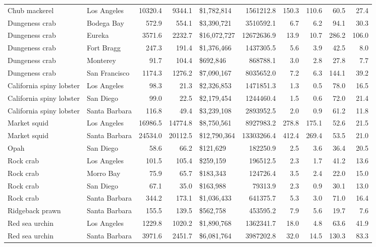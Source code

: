 \documentclass[
  letterpaper,
  DIV=11,
  numbers=noendperiod]{scrartcl}
\begin{document}
\begin{table}
{\begin{tabular}{llrrlrrrrr}
Chub mackerel & Los Angeles & 10320.4 & 9344.1 & \$1,782,814 & 1561212.8 & 150.3 & 110.6 & 60.5 & 27.4\\
Dungeness crab & Bodega Bay & 572.9 & 554.1 & \$3,390,721 & 3510592.1 & 6.7 & 6.2 & 94.1 & 30.3\\
\addlinespace
Dungeness crab & Eureka & 3571.6 & 2232.7 & \$16,072,727 & 12672636.9 & 13.9 & 10.7 & 286.2 & 106.0\\
Dungeness crab & Fort Bragg & 247.3 & 191.4 & \$1,376,466 & 1437305.5 & 5.6 & 3.9 & 42.5 & 8.0\\
Dungeness crab & Monterey & 91.7 & 104.4 & \$692,846 & 868788.1 & 3.0 & 2.8 & 27.8 & 7.7\\
Dungeness crab & San Francisco & 1174.3 & 1276.2 & \$7,090,167 & 8035652.0 & 7.2 & 6.3 & 144.1 & 39.2\\
California spiny lobster & Los Angeles & 98.3 & 21.3 & \$2,326,853 & 1471851.3 & 1.3 & 0.5 & 78.0 & 16.5\\
\addlinespace
California spiny lobster & San Diego & 99.0 & 22.5 & \$2,179,454 & 1244460.4 & 1.5 & 0.6 & 72.0 & 21.4\\
California spiny lobster & Santa Barbara & 116.8 & 49.4 & \$3,239,108 & 2893952.5 & 2.0 & 0.9 & 61.2 & 11.8\\
Market squid & Los Angeles & 16986.5 & 14774.8 & \$8,750,561 & 8927983.2 & 278.8 & 175.1 & 52.6 & 21.5\\
Market squid & Santa Barbara & 24534.0 & 20112.5 & \$12,790,364 & 13303266.4 & 412.4 & 269.4 & 53.5 & 21.0\\
Opah & San Diego & 58.6 & 66.2 & \$121,629 & 182250.9 & 2.5 & 3.6 & 36.4 & 20.5\\
\addlinespace
Rock crab & Los Angeles & 101.5 & 105.4 & \$259,159 & 196512.5 & 2.3 & 1.7 & 41.2 & 13.6\\
Rock crab & Morro Bay & 75.9 & 65.7 & \$183,343 & 124726.4 & 3.5 & 2.4 & 22.0 & 15.0\\
Rock crab & San Diego & 67.1 & 35.0 & \$163,988 & 79313.9 & 2.3 & 0.9 & 30.1 & 13.0\\
Rock crab & Santa Barbara & 344.2 & 173.1 & \$1,036,433 & 641375.7 & 5.3 & 3.0 & 71.0 & 16.4\\
Ridgeback prawn & Santa Barbara & 155.5 & 139.5 & \$562,758 & 453595.2 & 7.9 & 5.6 & 19.7 & 7.6\\
\addlinespace
Red sea urchin & Los Angeles & 1229.8 & 1020.2 & \$1,890,768 & 1362341.7 & 18.0 & 4.8 & 63.6 & 41.9\\
Red sea urchin & Santa Barbara & 3971.6 & 2451.7 & \$6,081,764 & 3987202.8 & 32.0 & 14.5 & 130.3 & 83.3\\

\end{tabular}}
\end{table}
\end{document}
